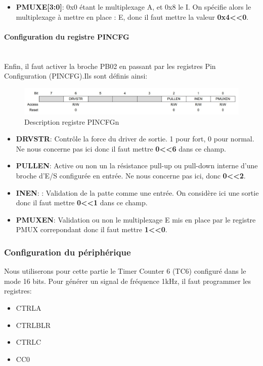 \documentclass[a4paper]{article}
\begin{document}
	\begin{itemize}
		\item {\bf PMUXE[3:0]}: 0x0 étant le multiplexage A, et 0x8 le I. On spécifie alors le multiplexage à mettre en place : E, donc il faut mettre la valeur {\bf 0x4\textless\textless0}.
	\end{itemize}
	
	\paragraph{Configuration du registre PINCFG} 
	~~\\
	Enfin, il faut activer la broche PB02 en passant par les registres Pin Configuration (PINCFG).Ils sont définis ainsi:   
	\begin{figure}[H]
		\centering
		\includegraphics[width=0.9\linewidth]{PINCFGn.jpg}
		\caption{Description registre PINCFGn}
	\end{figure}
	
	\begin{itemize}
		\item {\bf DRVSTR}: Contrôle la force du driver de sortie. 1 pour fort, 0 pour normal. Ne nous concerne pas ici donc il faut mettre {\bf 0\textless\textless6} dans ce champ.~~\\
		\item {\bf PULLEN}: Active ou non un la résistance pull-up ou pull-down interne d'une broche d'E/S configurée en entrée. Ne nous concerne pas ici, donc {\bf 0\textless\textless2}.~~\\
		\item {\bf INEN}: : Validation de la patte comme une entrée. On considère ici une sortie donc il faut mettre {\bf 0\textless\textless1} dans ce champ.~~\\
		\item {\bf PMUXEN}: Validation ou non le multiplexage E mis en place par le registre PMUX correpondant donc il faut mettre {\bf 1\textless\textless0}.~~\\
	\end{itemize}
	\newpage
	\subsubsection{Configuration du périphérique} 
	Nous utiliserons pour cette partie le Timer Counter 6 (TC6) configuré dans le mode 16 bits. Pour générer un signal de fréquence 1kHz, il faut programmer les registres:
	\begin{itemize}
		\item {CTRLA}
		\item {CTRLBLR}
		\item {CTRLC}
		\item {CC0}
	\end{itemize}
\end{document}
